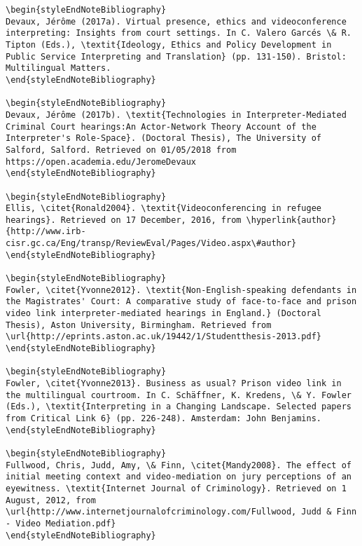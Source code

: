 \documentclass[output=paper]{langsci/langscibook}
\begin{document}
\begin{verbatim}
\begin{styleEndNoteBibliography}
Devaux, Jérôme (2017a). Virtual presence, ethics and videoconference interpreting: Insights from court settings. In C. Valero Garcés \& R. Tipton (Eds.), \textit{Ideology, Ethics and Policy Development in Public Service Interpreting and Translation} (pp. 131-150). Bristol: Multilingual Matters. 
\end{styleEndNoteBibliography}

\begin{styleEndNoteBibliography}
Devaux, Jérôme (2017b). \textit{Technologies in Interpreter-Mediated Criminal Court hearings:An Actor-Network Theory Account of the Interpreter's Role-Space}. (Doctoral Thesis), The University of Salford, Salford. Retrieved on 01/05/2018 from https://open.academia.edu/JeromeDevaux 
\end{styleEndNoteBibliography}

\begin{styleEndNoteBibliography}
Ellis, \citet{Ronald2004}. \textit{Videoconferencing in refugee hearings}. Retrieved on 17 December, 2016, from \hyperlink{author}{http://www.irb-cisr.gc.ca/Eng/transp/ReviewEval/Pages/Video.aspx\#author}
\end{styleEndNoteBibliography}

\begin{styleEndNoteBibliography}
Fowler, \citet{Yvonne2012}. \textit{Non-English-speaking defendants in the Magistrates' Court: A comparative study of face-to-face and prison video link interpreter-mediated hearings in England.} (Doctoral Thesis), Aston University, Birmingham. Retrieved from \url{http://eprints.aston.ac.uk/19442/1/Studentthesis-2013.pdf}  
\end{styleEndNoteBibliography}

\begin{styleEndNoteBibliography}
Fowler, \citet{Yvonne2013}. Business as usual? Prison video link in the multilingual courtroom. In C. Schäffner, K. Kredens, \& Y. Fowler (Eds.), \textit{Interpreting in a Changing Landscape. Selected papers from Critical Link 6} (pp. 226-248). Amsterdam: John Benjamins.
\end{styleEndNoteBibliography}

\begin{styleEndNoteBibliography}
Fullwood, Chris, Judd, Amy, \& Finn, \citet{Mandy2008}. The effect of initial meeting context and video-mediation on jury perceptions of an eyewitness. \textit{Internet Journal of Criminology}. Retrieved on 1 August, 2012, from \url{http://www.internetjournalofcriminology.com/Fullwood, Judd & Finn - Video Mediation.pdf}
\end{styleEndNoteBibliography}


\end{verbatim}
\end{document}
